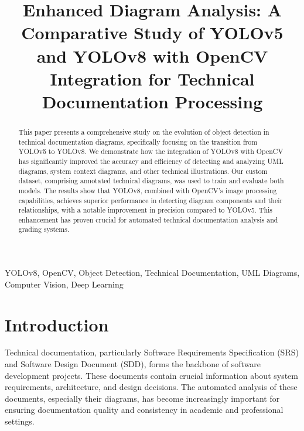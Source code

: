 \documentclass[conference]{IEEEtran}
\begin{document}
\title{Enhanced Diagram Analysis: A Comparative Study of YOLOv5 and YOLOv8 with OpenCV Integration for Technical Documentation Processing}

\author{
\and
{}
}

\maketitle

\begin{abstract}
This paper presents a comprehensive study on the evolution of object detection in technical documentation diagrams, specifically focusing on the transition from YOLOv5 to YOLOv8. We demonstrate how the integration of YOLOv8 with OpenCV has significantly improved the accuracy and efficiency of detecting and analyzing UML diagrams, system context diagrams, and other technical illustrations. Our custom dataset, comprising annotated technical diagrams, was used to train and evaluate both models. The results show that YOLOv8, combined with OpenCV's image processing capabilities, achieves superior performance in detecting diagram components and their relationships, with a notable improvement in precision compared to YOLOv5. This enhancement has proven crucial for automated technical documentation analysis and grading systems.
\end{abstract}

\begin{IEEEkeywords}
YOLOv8, OpenCV, Object Detection, Technical Documentation, UML Diagrams, Computer Vision, Deep Learning
\end{IEEEkeywords}

\section{Introduction}
Technical documentation, particularly Software Requirements Specification (SRS) and Software Design Document (SDD), forms the backbone of software development projects. These documents contain crucial information about system requirements, architecture, and design decisions. The automated analysis of these documents, especially their diagrams, has become increasingly important for ensuring documentation quality and consistency in academic and professional settings.
\end{document}
